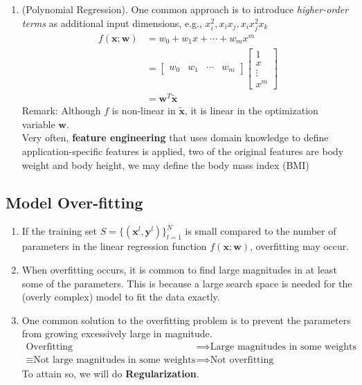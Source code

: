 \documentclass[11pt]{article}
\begin{document}
\begin{enumerate}
\begin{enumerate}
\item (Polynomial Regression). One common approach is to introduce \textit{higher-order terms} as additional input dimensions, e.g., $x_i ^2, x_i x_j, x_i x_j ^2 x_k$
\begin{align*}
f(\mathbf{x}; \mathbf{w}) &= w_0 +w_1 x+ \cdots+ w_m x^m\\
&= \begin{bmatrix}
w_0 & w_1 & \cdots & w_m
\end{bmatrix}\begin{bmatrix}
1\\ x\\ \vdots \\ x^m
\end{bmatrix}\\
&= \mathbf{w}^T \mathbf{\tilde{x}}
\end{align*}
Remark: Although $f$ is non-linear in $\mathbf{\tilde{x}}$, it is linear in the optimization variable $\mathbf{w}$.\\
Very often, \textbf{feature engineering} that uses domain knowledge to define application-specific features is applied, two of the original features are body weight and body height, we may define the body mass index (BMI)
\end{enumerate}
\end{enumerate}
\subsection{Model Over-fitting}
\begin{enumerate}
\item If the training set $S = \{(\mathbf{x}^{l}, \mathbf{y}^{l})\}_{l=1}^N$ is small compared to the number of parameters in the linear regression function $f(\mathbf{x}; \mathbf{w})$, overfitting may occur.
\item When overfitting occurs, it is common to find large magnitudes in at least some of the parameters. This is because a large search space is needed for the (overly complex) model to fit the data exactly.
\item One common solution to the overfitting problem is to prevent the parameters from growing excessively large in magnitude.
\begin{align*}
\text{Overfitting} &\implies \text{Large magnitudes in some weights}\\
\equiv \text{Not large magnitudes in some weights} &\implies \text{Not overfitting}
\end{align*}
To attain so, we will do \textbf{Regularization}.
\end{enumerate}
\end{document}
